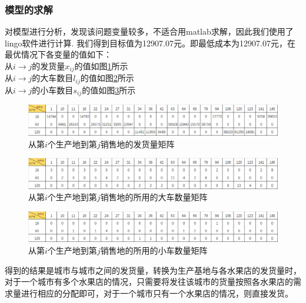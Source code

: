 \documentclass{article}
\begin{document}
	\subsubsection{模型的求解}
	对模型进行分析，发现该问题变量较多，不适合用matlab求解，因此我们使用了lingo软件进行计算.
	我们得到目标值为12907.07元。即最低成本为12907.07元，在最优情况下各变量的值如下：\\
	从$i\rightarrow j$的发货量$x_{i j}$的值如图\ref{fig:Xij}所示\\
	从$i\rightarrow j$的大车数目$l_{i j}$的值如图\ref{fig:lij}所示\\
	从$i\rightarrow j$的小车数目$s_{i j}$的值如图\ref{fig:sij}所示\\
	\begin{figure}[H]%
		\centering
		\includegraphics[width=1.0\linewidth]{img/Xij.png}
		\caption{从第$i$个生产地到第$j$销售地的发货量矩阵}
		\label{fig:Xij}
	\end{figure}
	
	\begin{figure}[H]
		\centering
		\includegraphics[width=1.0\linewidth]{img/lij.png}
		\caption{从第$i$个生产地到第$j$销售地的所用的大车数量矩阵}
		\label{fig:lij}
	\end{figure}
	
	\begin{figure}[H]
		\centering
		\includegraphics[width=1.0\linewidth]{img/sij.png}
		\caption{从第$i$个生产地到第$j$销售地的所用的小车数量矩阵}
		\label{fig:sij}
	\end{figure}

    得到的结果是城市与城市之间的发货量，转换为生产基地与各水果店的发货量时，对于一个城市有多个水果店的情况，只需要将发往该城市的货量按照各水果店的需求量进行相应的分配即可，对于一个城市只有一个水果店的情况，则直接发货。
   \\
   \\
\end{document}

